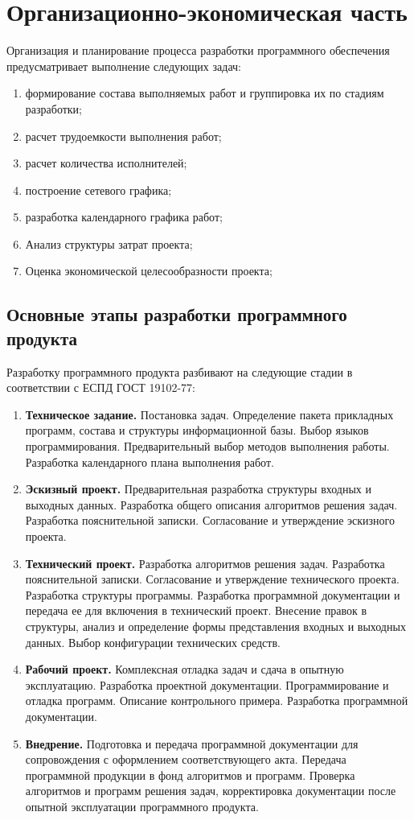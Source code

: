 \chapter{Организационно-экономическая часть}
Организация и планирование процесса разработки программного обеспечения предусматривает выполнение следующих задач:
\begin{enumerate}[1.]
\item формирование состава выполняемых работ и группировка их по стадиям разработки;
\item расчет трудоемкости выполнения работ;
\item расчет количества исполнителей;
\item построение сетевого графика;
\item разработка календарного графика работ;
\item Анализ структуры затрат проекта;
\item Оценка экономической целесообразности проекта;
\end{enumerate}

\section{Основные этапы разработки программного продукта}
Разработку программного продукта разбивают на следующие стадии в соответствии с ЕСПД ГОСТ 19102-77:
\begin{enumerate}[1.]
\item \textbf{Техническое задание.} Постановка задач. Определение пакета прикладных программ, состава и структуры информационной базы. Выбор языков программирования. Предварительный выбор методов выполнения работы. Разработка календарного плана выполнения работ.
\item \textbf{Эскизный проект.} Предварительная разработка структуры входных и выходных данных. Разработка общего описания алгоритмов решения задач. Разработка пояснительной записки. Согласование и утверждение эскизного проекта.
\item \textbf{Технический проект.} Разработка алгоритмов решения задач. Разработка пояснительной записки. Согласование и утверждение технического проекта. Разработка структуры программы. Разработка программной документации и передача ее для включения в технический проект. Внесение правок в структуры, анализ и определение формы представления входных и выходных данных. Выбор конфигурации технических средств.
\item \textbf{Рабочий проект.} Комплексная отладка задач и сдача в опытную эксплуатацию. Разработка проектной документации. Программирование и отладка программ. Описание контрольного примера. Разработка программной документации. 
\item \textbf{Внедрение.} Подготовка и передача программной документации для сопровождения с оформлением соответствующего акта. Передача программной продукции в фонд алгоритмов и программ. Проверка алгоритмов и программ решения задач, корректировка документации после опытной эксплуатации программного продукта.
\end{enumerate}

